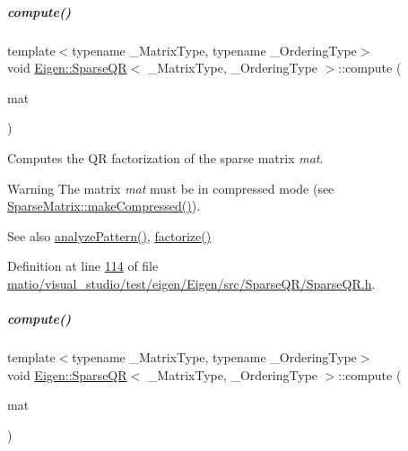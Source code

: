 \mbox{\label{group___sparse_q_r___module_aedaf52b7543de4d55c58c8f830c2aeb7}} 
\subparagraph{\texorpdfstring{compute()}{compute()}\hspace{0.1cm}{\footnotesize\ttfamily [1/2]}}
{\footnotesize\ttfamily template$<$typename \+\_\+\+Matrix\+Type, typename \+\_\+\+Ordering\+Type$>$ \\
void \hyperlink{group___sparse_q_r___module_class_eigen_1_1_sparse_q_r}{Eigen\+::\+Sparse\+QR}$<$ \+\_\+\+Matrix\+Type, \+\_\+\+Ordering\+Type $>$\+::compute (\begin{DoxyParamCaption}\item[{const Matrix\+Type \&}]{mat }\end{DoxyParamCaption})\hspace{0.3cm}{\ttfamily [inline]}}

Computes the QR factorization of the sparse matrix {\itshape mat}.

\begin{DoxyWarning}{Warning}
The matrix {\itshape mat} must be in compressed mode (see \hyperlink{group___sparse_core___module_a5ff54ffc10296f9466dc81fa888733fd}{Sparse\+Matrix\+::make\+Compressed()}).
\end{DoxyWarning}
\begin{DoxySeeAlso}{See also}
\hyperlink{group___sparse_q_r___module_a4b425ddb1358c914d764cde48853a4f6}{analyze\+Pattern()}, \hyperlink{group___sparse_q_r___module_a55a34bacf05bd30a1dacbccad9f03c6d}{factorize()} 
\end{DoxySeeAlso}


Definition at line \hyperlink{matio_2visual__studio_2test_2eigen_2_eigen_2src_2_sparse_q_r_2_sparse_q_r_8h_source_l00114}{114} of file \hyperlink{matio_2visual__studio_2test_2eigen_2_eigen_2src_2_sparse_q_r_2_sparse_q_r_8h_source}{matio/visual\+\_\+studio/test/eigen/\+Eigen/src/\+Sparse\+Q\+R/\+Sparse\+Q\+R.\+h}.

\mbox{\label{group___sparse_q_r___module_aedaf52b7543de4d55c58c8f830c2aeb7}} 
\subparagraph{\texorpdfstring{compute()}{compute()}\hspace{0.1cm}{\footnotesize\ttfamily [2/2]}}
{\footnotesize\ttfamily template$<$typename \+\_\+\+Matrix\+Type, typename \+\_\+\+Ordering\+Type$>$ \\
void \hyperlink{group___sparse_q_r___module_class_eigen_1_1_sparse_q_r}{Eigen\+::\+Sparse\+QR}$<$ \+\_\+\+Matrix\+Type, \+\_\+\+Ordering\+Type $>$\+::compute (\begin{DoxyParamCaption}\item[{const Matrix\+Type \&}]{mat }\end{DoxyParamCaption})\hspace{0.3cm}{\ttfamily [inline]}}

